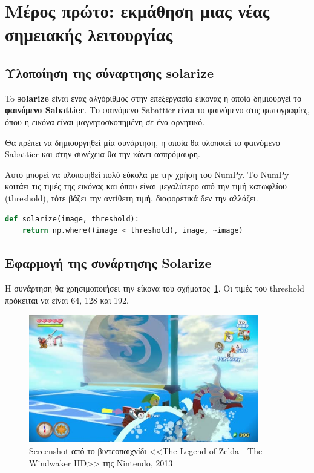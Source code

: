 \label{Chapter1}

\section{Μέρος πρώτο: εκμάθηση μιας νέας σημειακής λειτουργίας}

\subsection{Υλοποίηση της σύναρτησης solarize}

To \textbf{solarize} είναι ένας αλγόριθμος στην επεξεργασία είκονας η οποία δημιουργεί το \textbf{φαινόμενο Sabattier}.
Το φαινόμενο Sabattier είναι το φαινόμενο στις φωτογραφίες, όπου η εικόνα είναι μαγνητοσκοπημένη σε ένα αρνητικό.

\begin{problem}
	Θα πρέπει να δημιουργηθεί μία συνάρτηση, η οποία θα υλοποιεί το φαινόμενο Sabattier και στην συνέχεια θα την κάνει ασπρόμαυρη.
\end{problem}

Αυτό μπορεί να υλοποιηθεί πολύ εύκολα με την χρήση του NumPy.
Το NumPy κοιτάει τις τιμές της εικόνας και όπου είναι μεγαλύτερο από την τιμή κατωφλίου (threshold), τότε βάζει την αντίθετη τιμή, διαφορετικά δεν την αλλάζει.

\begin{lstlisting}[language=Python, caption=Solarize Function]
def solarize(image, threshold):
    return np.where((image < threshold), image, ~image)
\end{lstlisting}

\subsection{Εφαρμογή της συνάρτησης Solarize}


Η συνάρτηση θα χρησιμοποιήσει την είκονα του σχήματος~\ref{fig:zelda}. Οι τιμές του threshold πρόκειται να είναι 64, 128 και 192.

\begin{figure}[H]
	\centering
	\includegraphics[width=100mm]{Figures/zelda}
	\caption[The Legend of Zelda - The Windwaker HD]{Screenshot από το βιντεοπαιχνίδι <<The Legend of Zelda - The Windwaker HD>> της Nintendo, 2013}
	\label{fig:zelda}
\end{figure}

